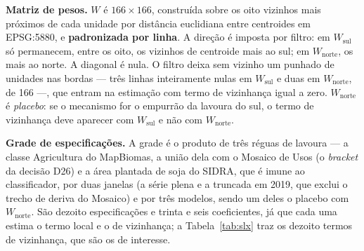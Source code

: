 \textbf{Matriz de pesos.} \(W\) é \(166 \times 166\), construída sobre os oito
vizinhos mais próximos de cada unidade por distância euclidiana entre
centroides em EPSG:5880, e \textbf{padronizada por linha}. A direção é imposta
por filtro: em \(W_{\mathrm{sul}}\) só permanecem, entre os oito, os vizinhos de
centroide mais ao sul; em \(W_{\mathrm{norte}}\), os mais ao norte. A diagonal é
nula. O filtro deixa sem vizinho um punhado de unidades nas bordas --- três
linhas inteiramente nulas em \(W_{\mathrm{sul}}\) e duas em
\(W_{\mathrm{norte}}\), de 166 ---, que entram na estimação com termo de
vizinhança igual a zero. \(W_{\mathrm{norte}}\) é \emph{placebo}: se o mecanismo for o empurrão da
lavoura do sul, o termo de vizinhança deve aparecer com \(W_{\mathrm{sul}}\) e
não com \(W_{\mathrm{norte}}\).

\textbf{Grade de especificações.} A grade é o produto de três réguas de
lavoura --- a classe Agricultura do MapBiomas, a união dela com o Mosaico de
Usos (o \emph{bracket} da decisão D26) e a área plantada de soja do SIDRA, que
é imune ao classificador, por duas janelas (a série plena e a truncada em
2019, que exclui o trecho de deriva do Mosaico) e por três modelos, sendo um
deles o placebo com $W_{\mathrm{norte}}$. São dezoito especificações e trinta e
seis coeficientes, já que cada uma estima o termo local e o de vizinhança; a
Tabela~\ref{tab:slx} traz os dezoito termos de vizinhança, que são os de
interesse.


